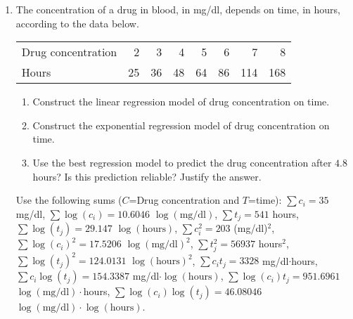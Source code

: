 \begin{enumerate}[leftmargin=*,resume]
\item The concentration of a drug in blood, in mg/dl, depends on time, in hours, according to the data below.
\begin{center}
\begin{tabular}{lrrrrrrr}
\toprule
Drug concentration & 2 & 3 & 4 & 5 & 6 & 7 & 8\\
Hours & 25 & 36 & 48 & 64 & 86 & 114 & 168\\
\bottomrule
\end{tabular}
\end{center}
\begin{enumerate}
\item Construct the linear regression model of drug concentration on time. 
\item Construct the exponential regression model of drug concentration on time. 
\item Use the best regression model to predict the drug concentration after $4.8$ hours? Is this prediction reliable?
Justify the answer.
\end{enumerate}

Use the following sums ($C$=Drug concentration and $T$=time): $\sum c_i=35$ mg/dl, $\sum \log(c_i)=10.6046$
$\log(\mbox{mg/dl})$, $\sum t_j=541$ hours, $\sum \log(t_j)= 29.147$ $\log(\mbox{hours})$, $\sum c_i^2=203$ (mg/dl)$^2$,
$\sum \log(c_i)^2=17.5206$ $\log(\mbox{mg/dl})^2$, $\sum t_j^2=56937$ hours$^2$, $\sum \log(t_j)^2=124.0131$
$\log(\mbox{hours})^2$, $\sum c_it_j=3328$ mg/dl$\cdot$hours, $\sum c_i\log(t_j)=154.3387$
mg/dl$\cdot\log(\mbox{hours})$, $\sum \log(c_i)t_j=951.6961$ $\log(\mbox{mg/dl})\cdot$hours, $\sum
\log(c_i)\log(t_j)=46.08046$ $\log(\mbox{mg/dl})\cdot\log(\mbox{hours})$.


\end{enumerate}
